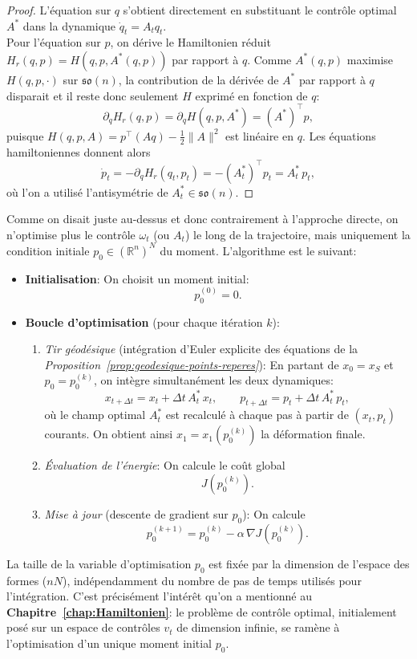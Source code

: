 \documentclass[12pt]{report}
\begin{document}
\begin{proof}
L'équation sur $q$ s'obtient directement en substituant le contrôle optimal $A^*$ dans la dynamique $\dot q_t=A_t{q}_t$.\\
Pour l'équation sur $p$, on dérive le Hamiltonien réduit $H_r(q,p)=H(q,p,A^*(q,p))$ par rapport à $q$. Comme $A^*(q,p)$ maximise $H(q,p,\cdot)$ sur $\mathfrak{so}(n)$, la contribution de la dérivée de $A^*$ par rapport à $q$ disparait et il reste donc seulement $H$ exprimé en fonction de $q$:
\[
\partial_{q}H_r(q,p)=\partial_{q}H(q,p,A^*)={(A^*)}^{\top}p,
\]
puisque $H(q,p,A)=p^{\top}(Aq)-\frac{1}{2}\|A\|^2$ est linéaire en $q$. Les équations hamiltoniennes donnent alors
\[
\dot p_t=-\partial_{q}H_r(q_t,p_t)=-{(A^*_t)}^{\top}p_t=A^*_t\,p_t,
\]
où l'on a utilisé l'antisymétrie de $A^*_t\in\mathfrak{so}(n)$.
\end{proof}

Comme on disait juste au-dessus et donc contrairement à l'approche directe, on n'optimise plus le contrôle $\omega_t$ (ou $A_t$) le long de la trajectoire, mais uniquement la condition initiale $p_0\in{(\mathbb{R}^n)}^N$ du moment. L'algorithme est le suivant:
\begin{itemize}
  \item \textbf{Initialisation}: On choisit un moment initial:
    \[
    p_0^{(0)}=0.
    \]
  \item \textbf{Boucle d'optimisation} (pour chaque itération $k$):
  \begin{enumerate}
    \item \textit{Tir géodésique} (intégration d'Euler explicite des équations de la \textit{Proposition~\ref{prop:geodesique-points-reperes}}): En partant de $x_0=x_S$ et $p_0=p_0^{(k)}$, on intègre simultanément les deux dynamiques:
    \[
    x_{t+\Delta t}=x_t+\Delta t\,A^*_t\,x_t,\qquad p_{t+\Delta t}=p_t+\Delta t\,A^*_t\,p_t,
    \]
    où le champ optimal $A^*_t$ est recalculé à chaque pas à partir de $(x_t,p_t)$ courants. On obtient ainsi $x_1=x_1(p_0^{(k)})$ la déformation finale.
    \item \textit{Évaluation de l'énergie}: On calcule le coût global
    \[
    J(p_0^{(k)}).
    \]
    \item \textit{Mise à jour} (descente de gradient sur $p_0$): On calcule
    \[
    p_0^{(k+1)}=p_0^{(k)}-\alpha\,\nabla J(p_0^{(k)}).
    \]
  \end{enumerate}
\end{itemize}

\begin{remark}
La taille de la variable d'optimisation $p_0$ est fixée par la dimension de l'espace des formes ($nN$), indépendamment du nombre de pas de temps utilisés pour l'intégration. C'est précisément l'intérêt qu'on a mentionné au \textbf{Chapitre~\ref{chap:Hamiltonien}}: le problème de contrôle optimal, initialement posé sur un espace de contrôles $v_t$ de dimension infinie, se ramène à l'optimisation d'un unique moment initial $p_0$.
\end{remark}
\end{document}
